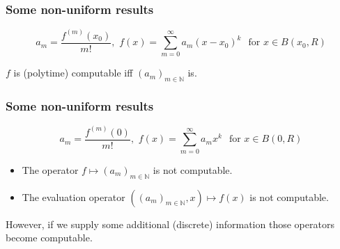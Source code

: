 \documentclass[xcolor=pdftex,dvipsnames,table,handout]{beamer}
\newcommand{\N}{\ensuremath{\mathbb{N}}}
\begin{document}
\begin{frame}
\frametitle{Some non-uniform results}

$$a_m =\frac{f^{(m)}(x_0)}{m!} 
, \,\, f(x) = \sum_{m=0}^\infty a_m(x-x_0)^k \,\ \text{ for } x \in B(x_0,R)
$$
\vfill
\begin{theorem}
$f$ is (polytime) computable iff $(a_m)_{m \in \N}$ is.
\end{theorem}
\end{frame}
\begin{frame}
\frametitle{Some non-uniform results}
$$a_m =\frac{f^{(m)}(0)}{m!} 
, \,\, f(x) = \sum_{m=0}^\infty a_mx^k \,\ \text{ for } x \in B(0,R)
$$
\vfill
\begin{theorem}[M\"uller (1995)]
\begin{itemize}
\item The operator $f \mapsto (a_m)_{m \in \N}$ is not computable.
\item The evaluation operator $((a_m)_{m \in \N},x) \mapsto f(x) $ is not computable.
\end{itemize}
\end{theorem}
\pause
However, if we supply some additional (discrete) information those operators become computable.
\end{frame}
\end{document}
